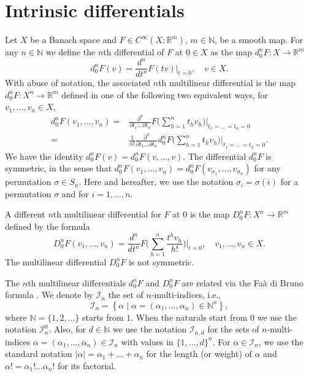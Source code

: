 \documentclass[12pt, reqno]{amsart}
\theoremstyle{plain}
\theoremstyle{definition}
\theoremstyle{remark}
\numberwithin{equation}{section}
\newcommand{\R}{\mathbb{R}}
\newcommand{\N}{\mathbb{N}}
\newcommand{\s}{\sigma}
\newcommand{\0}{\theta}
\renewcommand{\a}{\alpha}
\newcommand{\1}{{-1}}
\renewcommand{\=}{\coloneqq}
\renewcommand{\.}{\dots}
\begin{document}
\section{Intrinsic differentials}\label{sec:one}

Let $X$ be a Banach space and $F\in C^\infty (X; \R^m)$, $m\in\N$,  be a smooth  map. 
For any   $n\in \N$ we define the $n$th differential of $F$ at $0\in X$ as the map $d_0^n F : X\to\R^m$
 \[
 d_0^nF (v)=\frac{d^n}{dt^n} F(tv)\big|_{t=0},\quad v\in X.
 \]
 With abuse of notation, the associated $n$th multilinear differential is the map  $d _0^n F : X^n \to\R^m$ defined in one of the following two equivalent ways,
 for $v_1,\dots,v_n \in X$, 
 \begin{equation}\label{buio}
 \begin{split}
 d_0^nF (v_1,\dots,v_n)=& \frac{\partial ^n}{\partial t_1 \dots \partial t_n} 
 F\Big(\sum_{h=1}^n t_h v_h\Big)\bigg| _{t_1=\dots=t_n=0}
 \\
 =&\frac{1}{n!} \frac{\partial ^n}{\partial t_1 \dots \partial t_n} 
 d_0^n F\Big(\sum_{h=1}^n t_h v_h\Big)\bigg| _{t_1=\dots=t_n=0}
  .
 \end{split}
 \end{equation}
We have the identity $d_0^n F(v) = d_0^n F(v,\dots,v)$. The differential $d_0^nF$ is 
symmetric, in the sense that $d_0^nF (v_1,\dots,v_n)=d_0^nF (v_{\sigma_1},\dots,v_{\sigma_n} )$
 for any permutation $\sigma\in S_n$. Here and hereafter, we use the notation $\s_i= \s(i)$ for a permutation $\s$
  and for $i=1,\ldots,n$. 




A different   $n$th multilinear differential for $F$ at $0$ is  the map $D_0^n F:X^n \to \R^m$ defined by the formula
\begin{equation}
\label{DOF}
D_0^n F(v_1,\dots,v_n) =
\frac{d^n}{dt^n} F\Big(\sum_{h=1}^n\frac{t^h v_h}{h!}\Big)\bigg|_{t=0}, \quad v_1,\dots,v_n \in X.
\end{equation}
The multilinear differential $D_0^n F$ is not symmetric.

The $n$th multilinear differentials $d_0^nF $ and $  D_0^nF $ are related via the  Fa\`a di Bruno formula \cite{Joh02}.
We denote by   $\mathscr{I}_n$ the set of $n$-multi-indices, i.e.,
 \[
 \mathscr{I}_n=\left\{\a\mid \a=(\a_1,\dots,\a_n)\in \N^n\right\},
 \]
 where $\N =\{1,2,\dots\}$ starts from $1$. When the naturals start from $0$ we use the notation $ \mathscr{I}_n^0$. Also, for $d\in \N$ we use the notation $\mathscr{I}_{n,d}$ for the sets of $n$-multi-indices $\a=(\a_1,\dots,\a_n)\in \mathscr I_n$ with values in $\{1,\dots,d\}^n$. For  $\a\in \mathscr I_n$, we use the standard notation  $|\a|=\a_1+\dots+\a_n$  for the length (or weight) of $\alpha$ and  $\a!=\a_1!\dots\a_n!$ for its factorial. 
 
\end{document}
